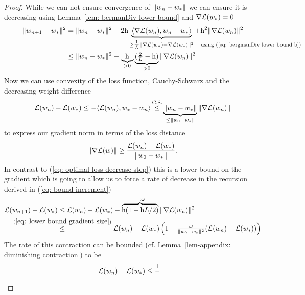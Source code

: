 \begin{proof}
	While we can not ensure convergence of \(\|w_n - w_*\|\) we can
	ensure it is decreasing using Lemma~\ref{lem: bermanDiv lower bound} and
	\(\nabla \mathcal{L}(w_*)=0\)
	\begin{align}
		\nonumber
		\|\weights_{n+1} - \minimum\|^2
		&= \|\weights_n - \minimum\|^2
		- 2\lr\underbrace{
			\langle \nabla\Loss(\weights_n), \weights_n - \minimum\rangle
		}_{
			\ge \tfrac{1}\ubound \|\nabla \Loss (\weights_n) - \nabla\Loss(\minimum)\|^2
			\mathrlap{\quad \text{using (\ref{eq: bergmanDiv lower bound b})}}
		} + \lr^2\|\nabla \Loss(\weights_n)\|^2
		\\
		&\le \|\weights_n - \minimum\|^2 - 
		\underbrace{\lr}_{>0}\underbrace{(\tfrac{2}{\ubound}-\lr)}_{>0}
		\|\nabla\Loss(\weights_n)\|^2
		\label{eq: decreasing weight difference}
	\end{align}
	Now we can use convexity of the loss function, Cauchy-Schwarz and the
	decreasing weight difference
	\begin{align*}
		\Loss(\weights_n)-\Loss(\minimum)
		\le -\langle \Loss(\weights_n), \minimum-\weights_n\rangle
		\xle{\text{C.S.}} \underbrace{\|\weights_n - \minimum\|}_{\le \|\weights_0 - \minimum\|}
		\|\nabla\Loss(\weights_n)\|
	\end{align*}
	to express our gradient norm in terms of the loss distance
	\begin{align}\label{eq: lower bound gradient size}
		\|\nabla\mathcal{L}(w)\|
		\ge \frac{\mathcal{L}(w_n)-\mathcal{L}(w_*)}{\|w_0-w_*\|}.
	\end{align}
	In contrast to (\ref{eq: optimal loss decrease step}) this is a lower bound
	on the gradient which is going to allow us to force a rate of decrease in
	the recursion derived in (\ref{eq: bound increment})
	\begin{align*}
		\Loss(\weights_{n+1}) - \Loss(\minimum)
		&\le \Loss(\weights_n)-\Loss(\minimum)
		- \overbrace{\lr(1-\lr\ubound/2)}^{=:\omega} \|\nabla \Loss(\weights_n)\|^2\\
		&\lxle{(\ref{eq: lower bound gradient size})}
		\Loss(\weights_n)-\Loss(\minimum)
		\left(1 - \tfrac{\omega}{\|\weights_0-\minimum\|^2}(\Loss(\weights_n)-\Loss(\minimum))\right)
	\end{align*}
	The rate of this contraction can be bounded (cf. Lemma~\ref{lem-appendix:
	diminishing contraction}) to be 
	\begin{align*}
		\mathcal{L}(w_n)-\mathcal{L}(w_*)
		&\le \frac{1}{
}
\end{align*}
\end{proof}
